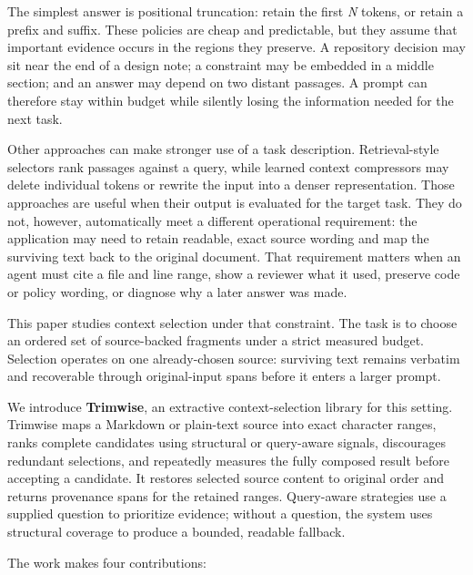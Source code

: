 \documentclass[
]{article}
\begin{document}
The simplest answer is positional truncation: retain the first \emph{N}
tokens, or retain a prefix and suffix. These policies are cheap and
predictable, but they assume that important evidence occurs in the
regions they preserve. A repository decision may sit near the end of a design
note; a constraint may be embedded in a middle section; and an answer
may depend on two distant passages. A prompt can therefore stay within
budget while silently losing the information needed for the next task.

Other approaches can make stronger use of a task description.
Retrieval-style selectors rank passages against a query, while learned
context compressors may delete individual tokens or rewrite the input
into a denser representation. Those approaches are useful when their
output is evaluated for the target task. They do not, however,
automatically meet a different operational requirement: the application
may need to retain readable, exact source wording and map the surviving
text back to the original document. That requirement matters when an
agent must cite a file and line range, show a reviewer what it used,
preserve code or policy wording, or diagnose why a later answer was
made.

This paper studies context selection under that constraint. The task is
to choose an ordered set of source-backed fragments under a strict
measured budget. Selection operates on one already-chosen source:
surviving text remains verbatim and recoverable through original-input
spans before it enters a larger prompt.

We introduce \textbf{Trimwise}, an extractive context-selection library
for this setting. Trimwise maps a Markdown or plain-text source into
exact character ranges, ranks complete candidates using structural or
query-aware signals, discourages redundant selections, and repeatedly
measures the fully composed result before accepting a candidate. It
restores selected source content to original order and returns
provenance spans for the retained ranges. Query-aware strategies use a
supplied question to prioritize evidence; without a question, the system
uses structural coverage to produce a bounded, readable fallback.

The work makes four contributions:
\end{document}
